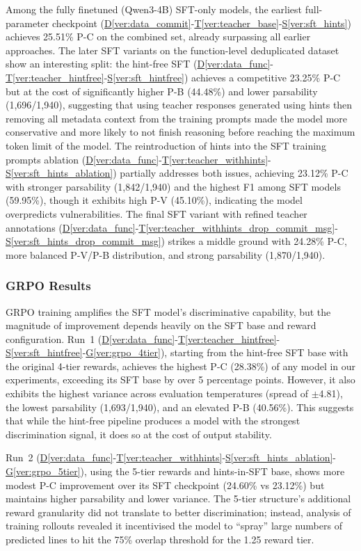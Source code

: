 \documentclass[12pt,a4paper]{article}
\newcommand{\vcode}[4]{\hyperref[#1]{D\ref*{#1}}-\hyperref[#2]{T\ref*{#2}}-\hyperref[#3]{S\ref*{#3}}-\hyperref[#4]{G\ref*{#4}}}
\newcommand{\vcodeSFT}[3]{\hyperref[#1]{D\ref*{#1}}-\hyperref[#2]{T\ref*{#2}}-\hyperref[#3]{S\ref*{#3}}}
\begin{document}
Among the fully finetuned (Qwen3-4B) SFT-only models, the earliest full-parameter checkpoint (\vcodeSFT{ver:data_commit}{ver:teacher_base}{ver:sft_hints}) achieves 25.51\% P-C on the combined set, already surpassing all earlier approaches. The later SFT variants on the function-level deduplicated dataset show an interesting split: the hint-free SFT (\vcodeSFT{ver:data_func}{ver:teacher_hintfree}{ver:sft_hintfree}) achieves a competitive 23.25\% P-C but at the cost of significantly higher P-B (44.48\%) and lower parsability (1,696/1,940), suggesting that using teacher responses generated using hints then removing all metadata context from the training prompts made the model more conservative and more likely to not finish reasoning before reaching the maximum token limit of the model. The reintroduction of hints into the SFT training prompts ablation (\vcodeSFT{ver:data_func}{ver:teacher_withhints}{ver:sft_hints_ablation}) partially addresses both issues, achieving 23.12\% P-C with stronger parsability (1,842/1,940) and the highest F1 among SFT models (59.95\%), though it exhibits high P-V (45.10\%), indicating the model overpredicts vulnerabilities. The final SFT variant with refined teacher annotations (\vcodeSFT{ver:data_func}{ver:teacher_withhints_drop_commit_msg}{ver:sft_hints_drop_commit_msg}) strikes a middle ground with 24.28\% P-C, more balanced P-V/P-B distribution, and strong parsability (1,870/1,940).

\subsubsection{GRPO Results}

GRPO training amplifies the SFT model's discriminative capability, but the magnitude of improvement depends heavily on the SFT base and reward configuration. Run~1 (\vcode{ver:data_func}{ver:teacher_hintfree}{ver:sft_hintfree}{ver:grpo_4tier}), starting from the hint-free SFT base with the original 4-tier rewards, achieves the highest P-C (28.38\%) of any model in our experiments, exceeding its SFT base by over 5 percentage points. However, it also exhibits the highest variance across evaluation temperatures (spread of $\pm$4.81), the lowest parsability (1,693/1,940), and an elevated P-B (40.56\%). This suggests that while the hint-free pipeline produces a model with the strongest discrimination signal, it does so at the cost of output stability.

Run~2 (\vcode{ver:data_func}{ver:teacher_withhints}{ver:sft_hints_ablation}{ver:grpo_5tier}), using the 5-tier rewards and hints-in-SFT base, shows more modest P-C improvement over its SFT checkpoint (24.60\% vs 23.12\%) but maintains higher parsability and lower variance. The 5-tier structure's additional reward granularity did not translate to better discrimination; instead, analysis of training rollouts revealed it incentivised the model to ``spray'' large numbers of predicted lines to hit the 75\% overlap threshold for the 1.25 reward tier.
\end{document}
